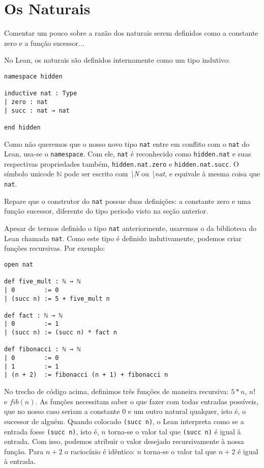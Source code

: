 \section{Os Naturais}
Comentar um pouco sobre a razão dos naturais serem definidos como a constante zero e a função sucessor...

No Lean, os naturais são definidos internamente como um tipo indutivo:

\begin{lstlisting}
namespace hidden

inductive nat : Type
| zero : nat
| succ : nat → nat

end hidden
\end{lstlisting}

Como não queremos que o nosso novo tipo \lstinline{nat} entre em conflito com o \lstinline{nat} do Lean, usa-se o \lstinline{namespace}. Com ele, \lstinline{nat} é reconhecido como \lstinline{hidden.nat} e suas respectivas propriedades também, \lstinline{hidden.nat.zero} e \lstinline{hidden.nat.succ}. O símbolo unicode $\mathbb{N}$ pode ser escrito com \textit{\textbackslash N} ou \textit{\textbackslash nat}, e equivale à mesma coisa que \lstinline{nat}.

Repare que o construtor do \lstinline{nat} possue duas definições: a constante zero e uma função sucessor, diferente do tipo periodo visto na seção anterior.

Apesar de termos definido o tipo \lstinline{nat} anteriormente, usaremos o da biblioteca do Lean chamada \lstinline{nat}. Como este tipo é definido indutivamente, podemos criar funções recursivas. Por exemplo:

\begin{lstlisting}
open nat

def five_mult : ℕ → ℕ
| 0        := 0
| (succ n) := 5 + five_mult n

def fact : ℕ → ℕ
| 0        := 1
| (succ n) := (succ n) * fact n

def fibonacci : ℕ → ℕ
| 0        := 0
| 1        := 1
| (n + 2)  := fibonacci (n + 1) + fibonacci n
\end{lstlisting}

No trecho de código acima, definimos três funções de maneira recursiva: $5*n$, $n!$ e $fib(n)$. As funções necessitam saber o que fazer com todas entradas possíveis, que no nosso caso seriam a constante $0$ e um outro natural qualquer, isto é, o sucessor de alguém. Quando colocado \lstinline{(succ n)}, o Lean interpreta como se a entrada fosse \lstinline{(succ n)}, isto é, $n$ torna-se o valor tal que \lstinline{(succ n)} é igual à entrada. Com isso, podemos atribuir o valor desejado recursivamente à nossa função. Para $n+2$ o raciocínio é idêntico: $n$ torna-se o valor tal que $n+2$ é igual à entrada.

